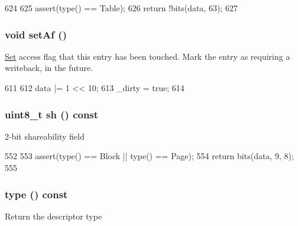 \begin{DoxyCode}
624         {
625             assert(type() == Table);
626             return !bits(data, 63);
627         }
\end{DoxyCode}
\hypertarget{classArmISA_1_1TableWalker_1_1LongDescriptor_aac2b49da99f498c6a7a8fecec04c7f1d}{
\subsubsection[{setAf}]{\setlength{\rightskip}{0pt plus 5cm}void setAf ()}}
\label{classArmISA_1_1TableWalker_1_1LongDescriptor_aac2b49da99f498c6a7a8fecec04c7f1d}
\hyperlink{classSet}{Set} access flag that this entry has been touched. Mark the entry as requiring a writeback, in the future. 


\begin{DoxyCode}
611         {
612             data |= 1 << 10;
613             _dirty = true;
614         }
\end{DoxyCode}
\hypertarget{classArmISA_1_1TableWalker_1_1LongDescriptor_a3446eaca4d3fe88011cc2ed1aceba481}{
\subsubsection[{sh}]{\setlength{\rightskip}{0pt plus 5cm}uint8\_\-t sh () const}}
\label{classArmISA_1_1TableWalker_1_1LongDescriptor_a3446eaca4d3fe88011cc2ed1aceba481}
2-\/bit shareability field 


\begin{DoxyCode}
552         {
553             assert(type() == Block || type() == Page);
554             return bits(data, 9, 8);
555         }
\end{DoxyCode}
\hypertarget{classArmISA_1_1TableWalker_1_1LongDescriptor_afeee2b784cb2b021c06cdde9c98130d0}{
\subsubsection[{type}]{ type () const}}
\label{classArmISA_1_1TableWalker_1_1LongDescriptor_afeee2b784cb2b021c06cdde9c98130d0}
Return the descriptor type 


